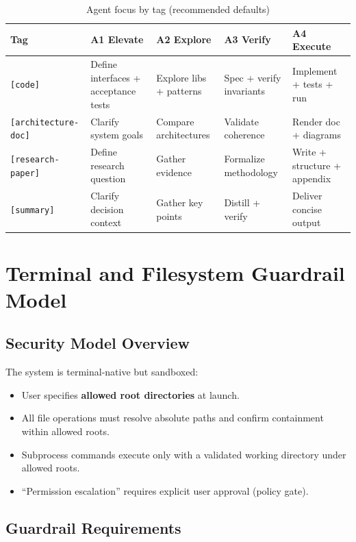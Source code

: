 \documentclass[11pt]{article}
\begin{document}
\begin{table}[H]
\centering
\caption{Agent focus by tag (recommended defaults)}
\label{tab:agent_tag_focus}
\begin{tabularx}{\textwidth}{@{}l X X X X@{}}
\toprule
\textbf{Tag} & \textbf{A1 Elevate} & \textbf{A2 Explore} & \textbf{A3 Verify} & \textbf{A4 Execute} \\
\midrule
\texttt{[code]} & Define interfaces + acceptance tests & Explore libs + patterns & Spec + verify invariants & Implement + tests + run \\
\texttt{[architecture-doc]} & Clarify system goals & Compare architectures & Validate coherence & Render doc + diagrams \\
\texttt{[research-paper]} & Define research question & Gather evidence & Formalize methodology & Write + structure + appendix \\
\texttt{[summary]} & Clarify decision context & Gather key points & Distill + verify & Deliver concise output \\
\bottomrule
\end{tabularx}
\end{table}

\section{Terminal and Filesystem Guardrail Model}

\subsection{Security Model Overview}

The system is terminal-native but sandboxed:
\begin{itemize}
  \item User specifies \textbf{allowed root directories} at launch.
  \item All file operations must resolve absolute paths and confirm containment within allowed roots.
  \item Subprocess commands execute only with a validated working directory under allowed roots.
  \item ``Permission escalation'' requires explicit user approval (policy gate).
\end{itemize}

\subsection{Guardrail Requirements}
\end{document}
